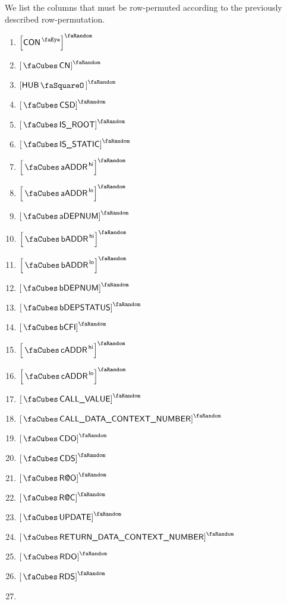 We list the columns that must be row-permuted according to the previously described row-permutation.
\begin{multicols}{3}
	\begin{enumerate}
		\item $\order{\peekContext}$
		\item $\order{\cnCn}$
		\item $\order{\hubStamp}$
		\item $\order{\cnCsd}$
		\item $\order{\cnIsRootContext}$
		\item $\order{\cnStatic}$
		\item $\order{\cnAccountAddress\high}$
		\item $\order{\cnAccountAddress\low}$
		\item $\order{\cnAccDepNum}$
		\item $\order{\cnCodeAddress\high}$
		\item $\order{\cnCodeAddress\low}$
		\item $\order{\cnCodeDepNum}$
		\item $\order{\cnCodeDepStatus}$
		\item $\order{\cnCodeCfi}$
		\item $\order{\cnCallerAddress\high}$
		\item $\order{\cnCallerAddress\low}$
		\item $\order{\cnCallValue}$
		\item $\order{\cnCallDataContextNumber}$
		\item $\order{\cnCdo}$
		\item $\order{\cnCds}$
		\item $\order{\cnRao}$
		\item $\order{\cnRac}$
		\item $\order{\cnUpdate}$
		\item $\order{\cnReturner}$
		\item $\order{\cnRdo}$
		\item $\order{\cnRds}$
		\item[\vspace{\fill}]
	\end{enumerate}
\end{multicols}
